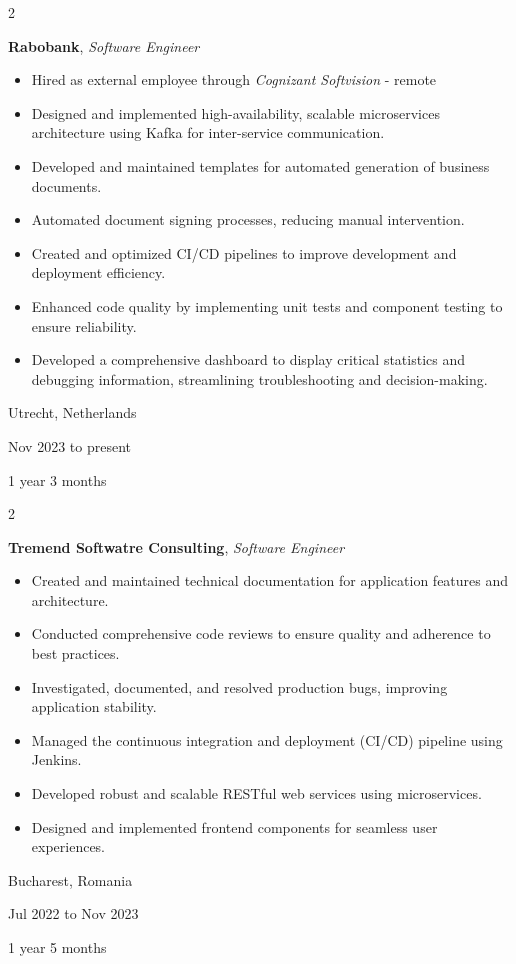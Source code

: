\documentclass[10pt, letterpaper]{article}
\newenvironment{highlights}{
    \begin{itemize}[
        topsep=0.10 cm,
        parsep=0.10 cm,
        partopsep=0pt,
        itemsep=0pt,
        leftmargin=0.4 cm + 10pt
    ]
}{
    \end{itemize}
} %
\newenvironment{twocolentry}[2][]{
    \onecolentry
    \def\secondColumn{#2}
    \setcolumnwidth{\fill, 3.5 cm}
    \begin{paracol}{2}
}{
    \switchcolumn \raggedleft \secondColumn
    \end{paracol}
    \endonecolentry
} %
\begin{document}
        
        \begin{twocolentry}{
            Utrecht, Netherlands

        Nov 2023 to present

        1 year 3 months
        }
            \textbf{Rabobank}, \textit{Software Engineer}
            \begin{highlights}
                \item Hired as external employee through \textit{Cognizant Softvision} - remote
                \item Designed and implemented high-availability, scalable microservices architecture using Kafka for inter-service communication.
                \item Developed and maintained templates for automated generation of business documents.
                \item Automated document signing processes, reducing manual intervention.
                \item Created and optimized CI/CD pipelines to improve development and deployment efficiency.
                \item Enhanced code quality by implementing unit tests and component testing to ensure reliability.
                \item Developed a comprehensive dashboard to display critical statistics and debugging information, streamlining troubleshooting and decision-making.
            \end{highlights}
        \end{twocolentry}


        \vspace{0.2 cm}

        \begin{twocolentry}{
            Bucharest, Romania

        Jul 2022 to Nov 2023

        1 year 5 months
        }
            \textbf{Tremend Softwatre Consulting}, \textit{Software Engineer}
            \begin{highlights}
                \item Created and maintained technical documentation for application features and architecture.
                \item Conducted comprehensive code reviews to ensure quality and adherence to best practices.
                \item Investigated, documented, and resolved production bugs, improving application stability.
                \item Managed the continuous integration and deployment (CI/CD) pipeline using Jenkins.
                \item Developed robust and scalable RESTful web services using microservices.
                \item Designed and implemented frontend components for seamless user experiences.
            \end{highlights}
        \end{twocolentry}
\end{document}
